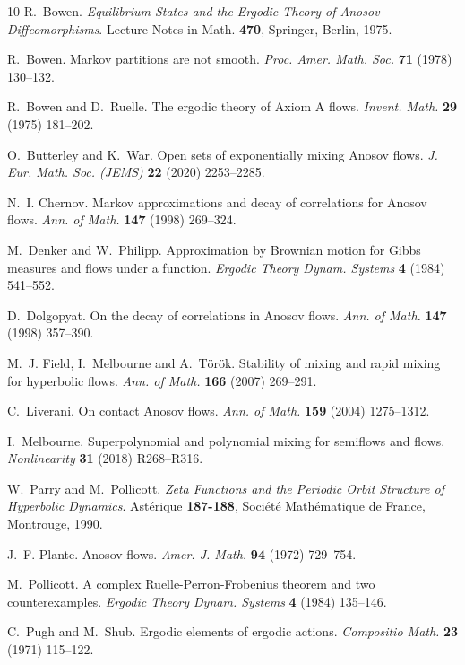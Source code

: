 \documentclass[12pt]{article}
\numberwithin{equation}{section}
\begin{document}
\begin{thebibliography}{10}
R.~Bowen. \emph{{Equilibrium States and the Ergodic Theory of Anosov
  Diffeomorphisms}}. Lecture Notes in Math. \textbf{470}, Springer, Berlin,
  1975.

R.~Bowen. Markov partitions are not smooth. \emph{Proc. Amer. Math. Soc.}
  \textbf{71} (1978) 130--132.

R.~Bowen and D.~Ruelle. {The ergodic theory of Axiom A flows}. \emph{Invent.
  Math.} \textbf{29} (1975) 181--202.

O.~Butterley and K.~War. Open sets of exponentially mixing {A}nosov flows.
  \emph{J. Eur. Math. Soc. (JEMS)} \textbf{22} (2020) 2253--2285.

N.~I. Chernov. {Markov approximations and decay of correlations for Anosov
  flows}. \emph{Ann. of Math.} \textbf{147} (1998) 269--324.

M.~Denker and W.~Philipp. {Approximation by Brownian motion for Gibbs measures
  and flows under a function}. \emph{Ergodic Theory Dynam. Systems} \textbf{4}
  (1984) 541--552.

D.~Dolgopyat. {On the decay of correlations in Anosov flows}. \emph{Ann. of
  Math.} \textbf{147} (1998) 357--390.

M.~J. Field, I.~Melbourne and A.~T{\" o}r{\" o}k. {Stability of mixing and
  rapid mixing for hyperbolic flows}. \emph{Ann. of Math.} \textbf{166} (2007)
  269--291.

C.~Liverani. {On contact Anosov flows}. \emph{Ann. of Math.} \textbf{159}
  (2004) 1275--1312.

I.~Melbourne. Superpolynomial and polynomial mixing for semiflows and flows.
  \emph{Nonlinearity} \textbf{31} (2018) R268--R316.

W.~Parry and M.~Pollicott. \emph{{Zeta Functions and the Periodic Orbit
  Structure of Hyperbolic Dynamics}}. Ast{\'e}rique \textbf{187-188},
  Soci{\'e}t{\'e} Math{\'e}matique de France, Montrouge, 1990.

J.~F. Plante. {Anosov flows}. \emph{Amer. J. Math.} \textbf{94} (1972)
  729--754.

M.~Pollicott. {A complex Ruelle-Perron-Frobenius theorem and two
  counterexamples}. \emph{Ergodic Theory Dynam. Systems} \textbf{4} (1984)
  135--146.

C.~Pugh and M.~Shub. Ergodic elements of ergodic actions. \emph{Compositio
  Math.} \textbf{23} (1971) 115--122.


\end{thebibliography}
\end{document}
